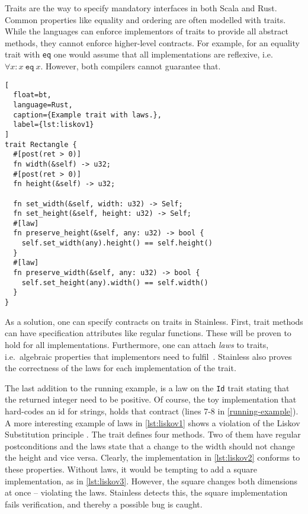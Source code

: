 Traits are the way to specify mandatory interfaces in both Scala and Rust.
Common properties like equality and ordering are often modelled with traits.
While the languages can enforce implementors of traits to provide all abstract
methods, they cannot enforce higher-level contracts. For example, for an
equality trait with \texttt{eq} one would assume that all implementations are
reflexive, i.e. $\forall x: x~\mathtt{eq}~x$. However, both compilers cannot
guarantee that.

\begin{lstlisting}[
  float=bt,
  language=Rust,
  caption={Example trait with laws.},
  label={lst:liskov1}
]
trait Rectangle {
  #[post(ret > 0)]
  fn width(&self) -> u32;
  #[post(ret > 0)]
  fn height(&self) -> u32;

  fn set_width(&self, width: u32) -> Self;
  fn set_height(&self, height: u32) -> Self;
  #[law]
  fn preserve_height(&self, any: u32) -> bool {
    self.set_width(any).height() == self.height()
  }
  #[law]
  fn preserve_width(&self, any: u32) -> bool {
    self.set_height(any).width() == self.width()
  }
}
\end{lstlisting}


As a solution, one can specify contracts on traits in Stainless. First, trait
methods can have specification attributes like regular functions. These will be
proven to hold for all implementations. Furthermore, one can attach \emph{laws}
to traits, i.e.~algebraic properties that implementors need to
fulfil~\cite[section "Specifying Algebraic Properties"]{stainless-doc}.
Stainless also proves the correctness of the laws for each implementation of the
trait.

The last addition to the running example, is a law on the \lstinline!Id! trait
stating that the returned integer need to be positive. Of course, the toy
implementation that hard-codes an id for strings, holds that contract (lines 7-8
in \autoref{running-example}). A more interesting example of laws in
\autoref{lst:liskov1} shows a violation of the  Liskov Substitution principle
\cite{liskov}. The trait defines four methods. Two of them have regular
postconditions and the laws state that a change to the width should not change
the height and vice versa. Clearly, the implementation in \autoref{lst:liskov2}
conforms to these properties. Without laws, it would be tempting to add a square
implementation, as in \autoref{lst:liskov3}. However, the square changes both
dimensions at once -- violating the laws. Stainless detects this, the square
implementation fails verification, and thereby a possible bug is caught.

